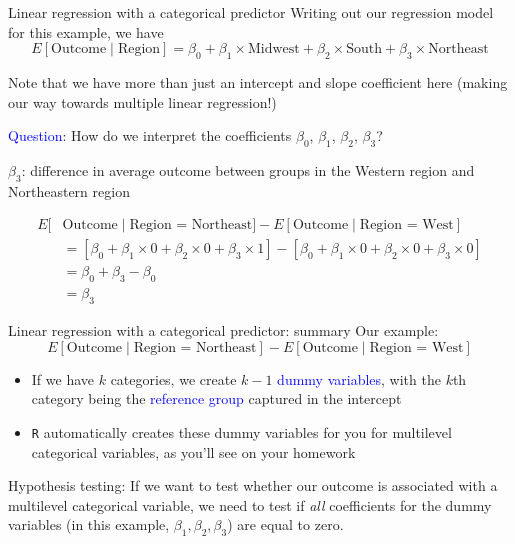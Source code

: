 \documentclass[10pt,t]{beamer}
\begin{document}
\begin{frame}{Linear regression with a categorical predictor}
Writing out our regression model for this example, we have
$$
E[\text{Outcome} \mid \text{Region}] = \beta_0 + \beta_1 \times \text{Midwest} + \beta_2 \times \text{South} + \beta_3 \times \text{Northeast}
$$

Note that we have more than just an intercept and slope coefficient here (making our way towards multiple linear regression!)

\vspace{0.3cm}

\textcolor{blue}{Question}: How do we interpret the coefficients $\beta_0$, $\beta_1$, $\beta_2$, $\beta_3$?

\vspace{0.3cm}

$\beta_3$: difference in average outcome between groups in the Western region and Northeastern region

\begin{align*}
E[&\text{Outcome} \mid  \text{Region = Northeast}] - E[\text{Outcome} \mid \text{Region = West}] \\
& = [\beta_0 + \beta_1 \times 0 + \beta_2 \times 0 + \beta_3 \times 1] - [\beta_0 + \beta_1 \times 0 + \beta_2 \times 0 + \beta_3 \times 0] \\
& = \beta_0 + \beta_3 - \beta_0 \\
& = \beta_3
\end{align*}

\end{frame}

\begin{frame}{Linear regression with a categorical predictor: summary}
Our example:
$$
E[\text{Outcome} \mid  \text{Region = Northeast}] - E[\text{Outcome} \mid \text{Region = West}] 
$$

\begin{itemize}
	\item If we have $k$ categories, we create $k - 1$ \textcolor{blue}{dummy variables}, with the $k$th category being the \textcolor{blue}{reference group} captured in the intercept
	\item \texttt{R} automatically creates these dummy variables for you for multilevel categorical variables, as you'll see on your homework
\end{itemize}

\vspace{0.3cm}

Hypothesis testing: If we want to test whether our outcome is associated with a multilevel categorical variable, we need to test if \textit{all} coefficients for the dummy variables (in this example, $\beta_1, \beta_2, \beta_3$) are equal to zero.

\end{frame}
\end{document}
